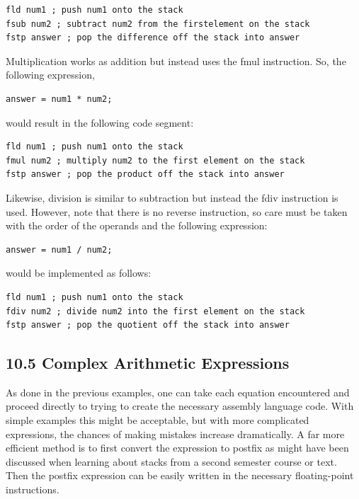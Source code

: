 \documentclass[10pt]{book}
\begin{document}
\begin{center}
\begin{center}
\begin{center}
\begin{center}
\begin{verbatim}
fld num1 ; push num1 onto the stack
fsub num2 ; subtract num2 from the firstelement on the stack
fstp answer ; pop the difference off the stack into answer
\end{verbatim}

Multiplication works as addition but instead uses the fmul instruction. So, the following expression,

\begin{verbatim}
answer = num1 * num2;
\end{verbatim}

would result in the following code segment:

\begin{verbatim}
fld num1 ; push num1 onto the stack
fmul num2 ; multiply num2 to the first element on the stack
fstp answer ; pop the product off the stack into answer
\end{verbatim}

Likewise, division is similar to subtraction but instead the fdiv instruction is used. However, note that there is no reverse instruction, so care must be taken with the order of the operands and the following expression:

\begin{verbatim}
answer = num1 / num2;
\end{verbatim}

would be implemented as follows:

\begin{verbatim}
fld num1 ; push num1 onto the stack
fdiv num2 ; divide num2 into the first element on the stack
fstp answer ; pop the quotient off the stack into answer
\end{verbatim}

\subsection*{10.5 Complex Arithmetic Expressions}
As done in the previous examples, one can take each equation encountered and proceed directly to trying to create the necessary assembly language code. With simple examples this might be acceptable, but with more complicated expressions, the chances of making mistakes increase dramatically. A far more efficient method is to first convert the expression to postfix as might have been discussed when learning about stacks from a second semester course or text. Then the postfix expression can be easily written in the necessary floating-point instructions.


\end{center}
\end{center}
\end{center}
\end{center}
\end{document}
